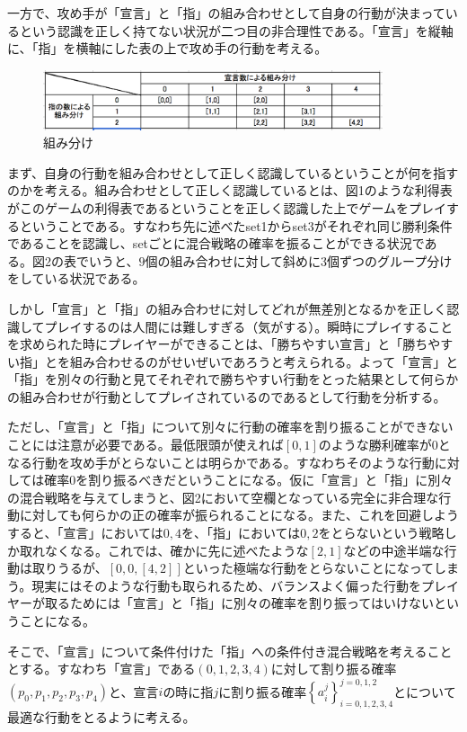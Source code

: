\documentclass{jsarticle}
\begin{document}
一方で、攻め手が「宣言」と「指」の組み合わせとして自身の行動が決まっているという認識を正しく持てない状況が二つ目の非合理性である。「宣言」を縦軸に、「指」を横軸にした表の上で攻め手の行動を考える。
\begin{figure}[h]
    \centering
    \includegraphics[width=10cm]{class2.png}
    \caption{組み分け}
\end{figure}
まず、自身の行動を組み合わせとして正しく認識しているということが何を指すのかを考える。組み合わせとして正しく認識しているとは、図1のような利得表がこのゲームの利得表であるということを正しく認識した上でゲームをプレイするということである。すなわち先に述べたset1からset3がそれぞれ同じ勝利条件であることを認識し、setごとに混合戦略の確率を振ることができる状況である。図2の表でいうと、$9$個の組み合わせに対して斜めに3個ずつのグループ分けをしている状況である。

しかし「宣言」と「指」の組み合わせに対してどれが無差別となるかを正しく認識してプレイするのは人間には難しすぎる（気がする）。瞬時にプレイすることを求められた時にプレイヤーができることは、「勝ちやすい宣言」と「勝ちやすい指」とを組み合わせるのがせいぜいであろうと考えられる。よって「宣言」と「指」を別々の行動と見てそれぞれで勝ちやすい行動をとった結果として何らかの組み合わせが行動としてプレイされているのであるとして行動を分析する。

ただし、「宣言」と「指」について別々に行動の確率を割り振ることができないことには注意が必要である。最低限頭が使えれば$[0,1]$のような勝利確率が$0$となる行動を攻め手がとらないことは明らかである。すなわちそのような行動に対しては確率$0$を割り振るべきだということになる。仮に「宣言」と「指」に別々の混合戦略を与えてしまうと、図2において空欄となっている完全に非合理な行動に対しても何らかの正の確率が振られることになる。また、これを回避しようすると、「宣言」においては$0,4$を、「指」においては$0,2$をとらないという戦略しか取れなくなる。これでは、確かに先に述べたような$[2,1]$などの中途半端な行動は取りうるが、$[0,0, [4,2]]$といった極端な行動をとらないことになってしまう。現実にはそのような行動も取られるため、バランスよく偏った行動をプレイヤーが取るためには「宣言」と「指」に別々の確率を割り振ってはいけないということになる。

そこで、「宣言」について条件付けた「指」への条件付き混合戦略を考えることとする。すなわち「宣言」である$(0,1,2,3,4)$に対して割り振る確率$(p_0,p_1,p_2,p_3,p_4)$と、宣言$i$の時に指$j$に割り振る確率$\left\{ a_i^j \right\}_{i = 0,1,2,3,4}^{j = 0,1,2}$とについて最適な行動をとるように考える。
\end{document}
